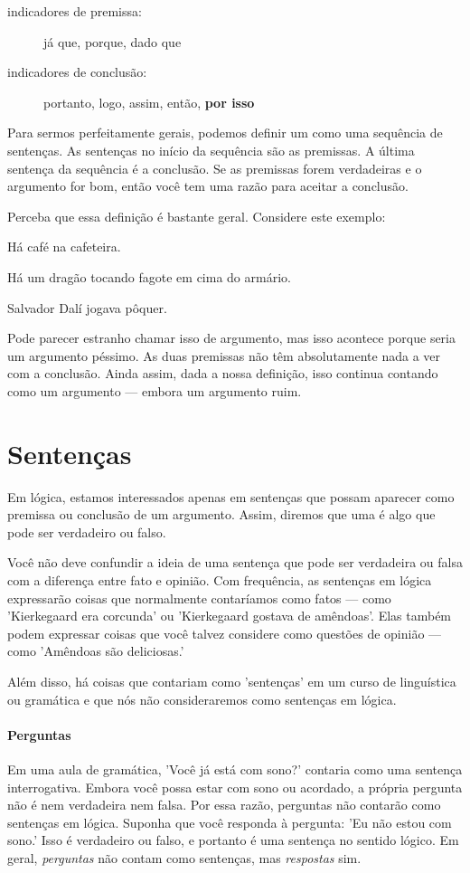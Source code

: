 \begin{description}
\item[indicadores de premissa:] já que, porque, dado que
\item[indicadores de conclusão:] portanto, logo, assim, então, \textbf{por isso}
\end{description}

Para sermos perfeitamente gerais, podemos definir um  como uma sequência de sentenças. As sentenças no início da sequência são as premissas. A última sentença da sequência é a conclusão. Se as premissas forem verdadeiras e o argumento for bom, então você tem uma razão para aceitar a conclusão.

Perceba que essa definição é bastante geral. Considere este exemplo:
\begin{earg}
\item[] Há café na cafeteira.
\item[] Há um dragão tocando fagote em cima do armário.
\item[\therefore] Salvador Dalí jogava pôquer.
\end{earg}
Pode parecer estranho chamar isso de argumento, mas isso acontece porque seria um argumento {péssimo}. As duas premissas não têm absolutamente nada a ver com a conclusão. Ainda assim, dada a nossa definição, isso continua contando como um argumento — embora um argumento ruim. 

\section{Sentenças}
\label{intro.sentences}
Em lógica, estamos interessados apenas em sentenças que possam aparecer como premissa ou conclusão de um argumento. Assim, diremos que uma  é algo que pode ser verdadeiro ou falso.

Você não deve confundir a ideia de uma sentença que pode ser verdadeira ou falsa com a diferença entre fato e opinião. Com frequência, as sentenças em lógica expressarão coisas que normalmente contaríamos como fatos — como 'Kierkegaard era corcunda' ou 'Kierkegaard gostava de amêndoas'. Elas também podem expressar coisas que você talvez considere como questões de opinião — como 'Amêndoas são deliciosas.'

Além disso, há coisas que contariam como 'sentenças' em um curso de linguística ou gramática e que nós não consideraremos como sentenças em lógica.

\paragraph{Perguntas} Em uma aula de gramática, 'Você já está com sono?' contaria como uma sentença interrogativa. Embora você possa estar com sono ou acordado, a própria pergunta não é nem verdadeira nem falsa. Por essa razão, perguntas não contarão como sentenças em lógica. Suponha que você responda à pergunta: 'Eu não estou com sono.' Isso é verdadeiro ou falso, e portanto é uma sentença no sentido lógico. Em geral, \emph{perguntas} não contam como sentenças, mas \emph{respostas} sim.

